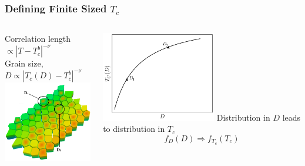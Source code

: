 \documentclass{beamer}
\begin{document}
\begin{frame}
	\frametitle{Defining Finite Sized $T_c$}
	\begin{columns}
		\column{6cm}
		\begin{center}
		Correlation length $\propto |T-T_c^b|^{-\nu}$ \\ \vspace{3mm}
		Grain size, $D \propto |T_c(D)-T_c^b|^{-\nu}$ \\ \vspace{3mm}
		\includegraphics[width=5cm]{Images/grains2}
		\end{center}
		\column{6cm}
		\begin{center}
		\includegraphics[width=5cm]{Images/TcD}
		\vspace{4mm}
		Distribution in $D$ leads to distribution in $T_c$
		$$
		f_D(D) \Longrightarrow f_{T_c}(T_c)
		$$
		\end{center}
	\end{columns}
\end{frame}
\end{document}
